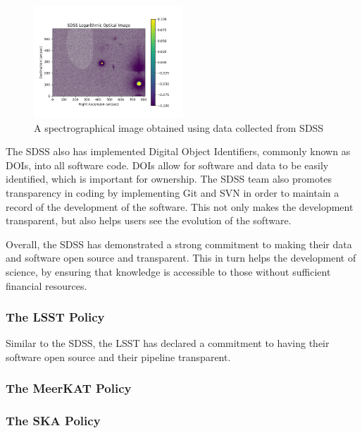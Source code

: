 \documentclass[preprint,linenumbers, longauthor]{aastex631}
\begin{document}
\begin{figure}[h!]
  \centering
  \includegraphics[width=0.5\textwidth]{SDSS_Optical_Image.png}
  \caption{A spectrographical image obtained using data collected from SDSS}
  \label{fig:SDSS_Optical_Image}
\end{figure}

The SDSS also has implemented Digital Object Identifiers, commonly known as DOIs, into all software code. DOIs allow for software and data to be easily identified, which is important for ownership.
The SDSS team also promotes transparency in coding by implementing Git and SVN in order to maintain a record of the development of the software. This not only makes the development transparent, but also helps users see the evolution of the software.

Overall, the SDSS has demonstrated a strong commitment to making their data and software open source and transparent. This in turn helps the development of science, by ensuring that knowledge is accessible to those without sufficient financial resources. 

\subsubsection{The LSST Policy}
Similar to the SDSS, the LSST has declared a commitment to having their software open source and their pipeline transparent.

\subsubsection{The MeerKAT Policy}

\subsubsection{The SKA Policy}

\end{document}
